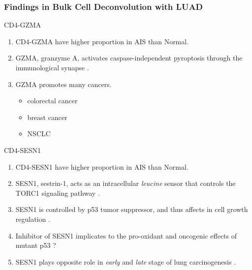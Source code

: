 \documentclass{beamer}
\begin{document}
    \begin{frame}[allowframebreaks]
        \frametitle{Findings in Bulk Cell Deconvolution with LUAD}

        \begin{block}{CD4-GZMA}
            \begin{enumerate}
                \item CD4-GZMA have higher proportion in AIS than Normal.
                \item GZMA, granzyme A, activates caspase-independent pyroptosis through the immunological synapse \cite{GZMA-1, GZMA-2, GZMA-3}.
                \item GZMA promotes many cancers.
                \begin{itemize}
                    \item colorectal cancer \cite{GZMA-4, GZMA-5}
                    \item breast cancer \cite{GZMA-6}
                    \item NSCLC \cite{GZMA-7}
                \end{itemize}
            \end{enumerate}
        \end{block}

        \begin{block}{CD4-SESN1}
            \begin{enumerate}
                \item CD4-SESN1 have higher proportion in AIS than Normal.
                \item SESN1, sestrin-1, acts as an intracellular \textit{leucine} sensor that controls the TORC1 signaling pathway \cite{SESN1-1, SESN1-2}.
                \item SESN1 is controlled by p53 tumor suppressor, and thus affects in cell growth regulation \cite{SESN1-3}.
                \item Inhibitor of SESN1 implicates to the pro-oxidant and oncogenic effects of mutant p53 \cite{SESN1-4}?
                \item SESN1 plays opposite role in \textit{early} and \textit{late} stage of lung carcinogenesis \cite{SESN1-5}.
            \end{enumerate}
        \end{block}


\end{frame}
\end{document}
